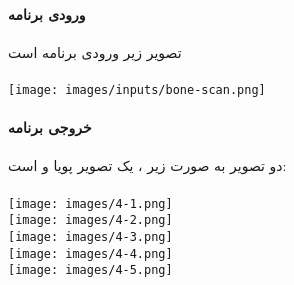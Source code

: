 \documentclass[12pt]{article}
\begin{document}
		\paragraph{ورودی برنامه}
		تصویر زیر ورودی برنامه است \\
		\vspace{0.5cm}\\
		\texttt{[image: images/inputs/bone-scan.png]}
		\paragraph{خروجی برنامه} 
		دو تصویر به صورت زیر ، یک تصویر پویا و 
		 است:\\
		\vspace{0.5cm}\\
		\texttt{[image: images/4-1.png]}\\
		\texttt{[image: images/4-2.png]}\\
		\texttt{[image: images/4-3.png]}\\
		\texttt{[image: images/4-4.png]}\\
		\texttt{[image: images/4-5.png]}
		
		
	\newpage
	\raggedleft
	
\end{document}
